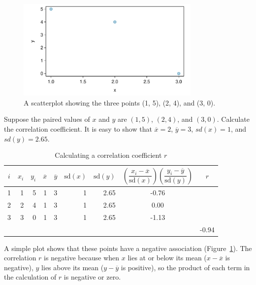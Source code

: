 \begin{figure}[h]
	\centering
	\includegraphics[width=0.8\textwidth]
	{ch_intro_to_data_oi_biostat/figures/corCalcSimple/corCalcSimple.pdf}
	\caption{A scatterplot showing the three points (1, 5), (2, 4), and (3, 0).} 
	\label{fig:corCalcSimple}
\end{figure}

\begin{example}{Suppose the paired values of $x$ and $y$ are $(1,5)$, $(2,4)$, and $(3,0)$. Calculate the correlation coefficient.} It is easy to show that $\overline{x} = 2$, $\overline{y} = 3$, $sd(x) = 1$, and $sd(y) = 2.65$. 
    
    \begin{table}[h]
        \centering
        \begin{tabular}{crrrrrrcc}
            \hline
        $i$ &   $x_i$ & $y_i$ & $\overline{x}$ & $\overline{y}$ & $\text{sd}(x)$ & $\text{sd}(y)$  & $\left(\dfrac{x_i - \overline{x}}{\text{sd}(x)}\right)
	\left(\dfrac{y_i - \overline{y}}{\text{sd}(y)}\right)$ & $r$\\
            \hline
             1 &  1 & 5 &  1 & 3 &  1 &  2.65 &  -0.76 &    \\
			  2 &  2 & 4 &  1 & 3 &  1 &  2.65 &  0.00 &        \\
			   3 &  3 & 0 &  1 & 3 &  1 &  2.65 &  -1.13 &    \\
			   &  &  &  &  &   &   &   &    -0.94  \\
            \hline
        \end{tabular}
        \caption{Calculating a correlation coefficient $r$}
        \label{table:corCalcSimple}
    \end{table}
    
A simple plot shows that these points have a negative association (Figure~\ref{fig:corCalcSimple}).  The correlation $r$ is negative because when $x$ lies at or below its mean ($x - \overline{x}$ is negative), $y$ lies above its mean ($y - \overline{y}$ is positive), so the product of each term in the calculation of $r$ is negative or zero. 
 
\end{example}

